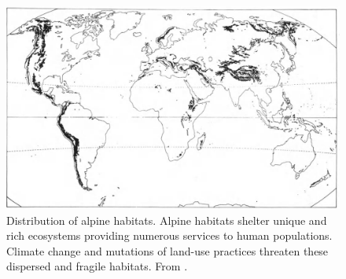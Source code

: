 \begin{figure}
\includegraphics{./1_Introduction/graphics/alpine_distribution.jpeg}
\caption{Distribution of alpine habitats. Alpine habitats shelter unique and rich ecosystems providing numerous services to human populations. Climate change and mutations of land-use practices threaten these dispersed and fragile habitats. From \cite{korner_alpine_2003}.} \label{fig:distribution}
\end{figure}
